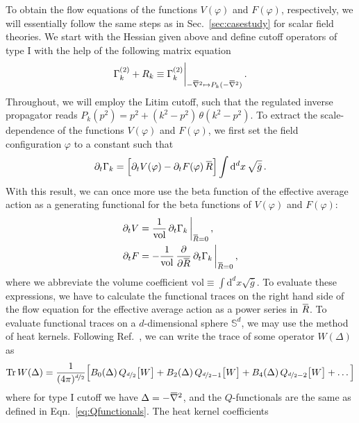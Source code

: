 \documentclass[11pt]{book}
\newcommand{\overbar}[1]{\mkern 1.5mu\overline{\mkern-1.5mu#1\mkern-1.5mu}\mkern 1.5mu}
\newcommand{\bnabla}{\overbar \nabla}
\newcommand{\bR}{\overbar R}
\newcommand{\Tr}{\mathrm{Tr}}
\numberwithin{equation}{chapter}
\begin{document}
\begin{appendices}
To obtain the flow equations of the functions $V(\varphi)$
and $F(\varphi)$, respectively, we will essentially follow the
same steps as in Sec.~\ref{sec:casestudy} for scalar field theories.
We start with the Hessian given above and
define cutoff operators of type I with the help of the following matrix equation
\begin{align}
  \Gamma_k^{(2)} + R_k \equiv \Gamma_k^{(2)} \bigg|_{-\bnabla^2 \mapsto P_k(-\bnabla^2)} \,.
  \label{eq:cutoffappB}
\end{align}
Throughout, we will employ the Litim cutoff, such that the regulated
inverse propagator reads $P_k(p^2) = p^2 + (k^2-p^2) \, \theta(k^2-p^2)$.
To extract the scale-dependence of the functions $V(\varphi)$ and
$F(\varphi)$, we first set the field configuration $\varphi$ to a constant such that
\begin{align}
  \partial_t \Gamma_k =
  \Big[ \partial_t V(\varphi) - \partial_t F(\varphi) \, \bR \Big] \int \mathrm{d}^d x \, \sqrt{\bar g} \,.
\end{align}
With this result, we can once more use the beta function of the
effective average action as a generating functional for the
beta functions of $V(\varphi)$ and $F(\varphi)$:
\begin{align}
  \partial_t V &=   \frac{1}{\mathrm{vol}} \, \partial_t \Gamma_k                                 \, \bigg|_{\bR=0} \,, \\
  \partial_t F &= - \frac{1}{\mathrm{vol}} \, \frac{\partial}{\partial \bR} \, \partial_t \Gamma_k  \, \bigg|_{\bR=0} \,,
\end{align}
where we abbreviate the volume coefficient
$\mathrm{vol} \equiv \int \mathrm{d}^d x \sqrt{\bar g}$.
To evaluate these expressions, we have to calculate the functional
traces on the right hand side of the flow equation for the
effective average action as a power series in $\bR$.
To evaluate functional traces on a $d$-dimensional sphere $\mathbb S^d$,
we may use the method of heat kernels.
Following Ref.~\cite{Codello:2008vh}, we can write the trace of some operator
$W(\Delta)$ as
\begin{align}
  \Tr \, W(\Delta) =
  \frac{1}{(4 \pi)^{\nicefrac d2}}
  \Big[
    B_0(\Delta) \, Q_{\nicefrac d2 }  \big[ W \big]
    + B_2(\Delta) \, Q_{\nicefrac d2 - 1 }  \big[ W \big]
    + B_4(\Delta) \, Q_{\nicefrac d2 - 2 }  \big[ W \big]
    + \dots
  \Big]
  \label{heatkernelexpansion}
\end{align}
where for type I cutoff we have $\Delta = -\bnabla^2$, and the $Q$-functionals
are the same as defined in Eqn.~\eqref{eq:Qfunctionals}. The heat kernel coefficients

\end{appendices}
\end{document}
